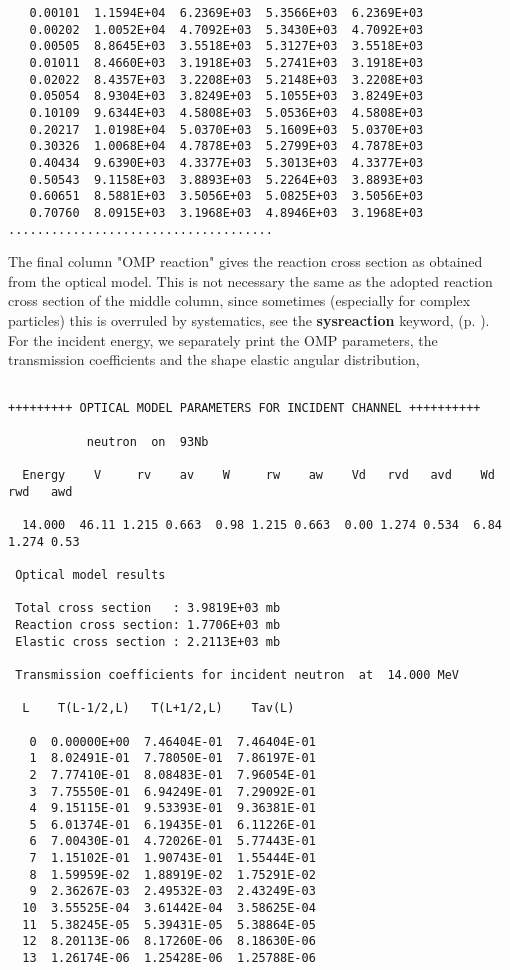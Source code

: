 \begin{samplecase}
{\begin{verbatim}
   0.00101  1.1594E+04  6.2369E+03  5.3566E+03  6.2369E+03
   0.00202  1.0052E+04  4.7092E+03  5.3430E+03  4.7092E+03
   0.00505  8.8645E+03  3.5518E+03  5.3127E+03  3.5518E+03
   0.01011  8.4660E+03  3.1918E+03  5.2741E+03  3.1918E+03
   0.02022  8.4357E+03  3.2208E+03  5.2148E+03  3.2208E+03
   0.05054  8.9304E+03  3.8249E+03  5.1055E+03  3.8249E+03
   0.10109  9.6344E+03  4.5808E+03  5.0536E+03  4.5808E+03
   0.20217  1.0198E+04  5.0370E+03  5.1609E+03  5.0370E+03
   0.30326  1.0068E+04  4.7878E+03  5.2799E+03  4.7878E+03
   0.40434  9.6390E+03  4.3377E+03  5.3013E+03  4.3377E+03
   0.50543  9.1158E+03  3.8893E+03  5.2264E+03  3.8893E+03
   0.60651  8.5881E+03  3.5056E+03  5.0825E+03  3.5056E+03
   0.70760  8.0915E+03  3.1968E+03  4.8946E+03  3.1968E+03
.....................................
\end{verbatim} } \renewcommand{\baselinestretch}{1.07}\small\normalsize
\noindent
The final column "OMP reaction" gives the reaction cross section as obtained 
from the optical model. This is not necessary the same as the adopted reaction 
cross section of the middle column, since sometimes (especially for complex 
particles) this is overruled by 
systematics, see the {\bf sysreaction} keyword, (p.  \pageref{key:sysreaction}).
For the incident energy, we separately print the OMP parameters, the 
transmission coefficients and the shape elastic angular distribution,

{\small \begin{verbatim}

+++++++++ OPTICAL MODEL PARAMETERS FOR INCIDENT CHANNEL ++++++++++
 
           neutron  on  93Nb
 
  Energy    V     rv    av    W     rw    aw    Vd   rvd   avd    Wd   rwd   awd
   
  14.000  46.11 1.215 0.663  0.98 1.215 0.663  0.00 1.274 0.534  6.84 1.274 0.53
   
 Optical model results  
   
 Total cross section   : 3.9819E+03 mb
 Reaction cross section: 1.7706E+03 mb
 Elastic cross section : 2.2113E+03 mb
   
 Transmission coefficients for incident neutron  at  14.000 MeV
   
  L    T(L-1/2,L)   T(L+1/2,L)    Tav(L)
   
   0  0.00000E+00  7.46404E-01  7.46404E-01
   1  8.02491E-01  7.78050E-01  7.86197E-01
   2  7.77410E-01  8.08483E-01  7.96054E-01
   3  7.75550E-01  6.94249E-01  7.29092E-01
   4  9.15115E-01  9.53393E-01  9.36381E-01
   5  6.01374E-01  6.19435E-01  6.11226E-01
   6  7.00430E-01  4.72026E-01  5.77443E-01
   7  1.15102E-01  1.90743E-01  1.55444E-01
   8  1.59959E-02  1.88919E-02  1.75291E-02
   9  2.36267E-03  2.49532E-03  2.43249E-03
  10  3.55525E-04  3.61442E-04  3.58625E-04
  11  5.38245E-05  5.39431E-05  5.38864E-05
  12  8.20113E-06  8.17260E-06  8.18630E-06
  13  1.26174E-06  1.25428E-06  1.25788E-06


\end{verbatim}}
\end{samplecase}
